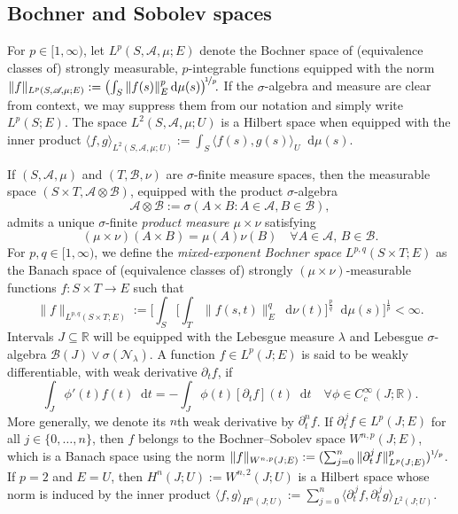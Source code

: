 \documentclass[reqno]{amsart}
\numberwithin{equation}{section}
\newcommand{\R}{\mathbb{R}}
\newcommand{\cB}{\mathcal{B}}
\newcommand{\cN}{\mathcal{N}}
\newcommand{\norm}[2]{     \| #1       \|_{ #2 }}
\newcommand{\scalar}[2]{     \langle #1       \rangle_{ #2 }}
\newcommand{\rd}{\mathop{}\!\mathrm{d}}
\newcommand{\from}{\colon}
\theoremstyle{remark}
\theoremstyle{definition}
\begin{document}
\subsection{Bochner and Sobolev spaces}
\label{subsec:app-func-spaces:Bochner-Sobolev}
For $p \in [1,\infty)$, let $L^p(S, \mathscr A\!, \mu;E)$ denote the Bochner space of 
(equivalence classes of)
strongly measurable, 
$p$-integrable functions
equipped with the norm 
% 
$
\norm{f}{L^p(S, \mathscr A \!, \mu;E)} 
:= 
\left( \int_S \norm{f(s)}{E}^p \rd \mu(s) \right)^{\!\nicefrac{1}{p}}\!\!.
$
%
If the $\sigma$-algebra and measure are clear from context,
we may suppress them from our notation and simply write $L^p(S; E)$.
The space $L^2(S, \mathscr A \!, \mu; U)$ is a Hilbert space
when equipped with the inner product 
$\scalar{f,g}{L^2(S, \mathscr A \!, \mu; U)} := \int_S \scalar{f(s),g(s)}{U} \rd \mu(s)$.

If $(S, \mathscr A\!, \mu)$ and $(T, \mathscr B, \nu)$ are $\sigma$-finite measure spaces,
then the measurable space $(S \times T, \mathscr A \otimes \mathscr B)$,
equipped with the product $\sigma$-algebra
%
\[
\mathscr A \otimes \mathscr B := \sigma(A \times B : A \in \mathscr A, B \in \mathscr B),
\]
%
admits a unique $\sigma$-finite \emph{product measure $\mu\times \nu$}
satisfying 
%
\[
(\mu \times \nu)(A \times B) = \mu(A) \nu(B) \quad \forall A \in \mathscr A, \, B \in \mathscr B.
\]
%
For $p, q \in [1,\infty)$, we define the \emph{mixed-exponent Bochner space}
$L^{p,q}(S \times T; E)$ as the Banach space of (equivalence classes of) 
strongly $(\mu \times \nu)$-measurable functions $f \from S \times T \to E$
such that
%
\begin{equation}
	\| f \|_{L^{p,q}(S \times T; E)}
	:=
	\biggl[\int_S \biggl[ \int_T \| f(s, t) \|_E^q \rd \nu(t)  \biggr]^{\frac{p}{q}} \rd \mu(s) \biggr]^{\frac{1}{p}}
	<
	\infty.
\end{equation}
%
Intervals $J \subseteq \R$ will be equipped with the Lebesgue measure $\lambda$
and Lebesgue $\sigma$-algebra $\cB(J) \vee \sigma(\cN_\lambda)$.
A function $f \in L^p(J; E)$ is said to be weakly differentiable,
with weak derivative $\partial_t f$, 
if
\[ 
\int_J \phi'(t) f(t) \rd t = -\int_J \phi(t) [\partial_t f](t) \rd t \quad \forall \phi \in C^\infty_c(J; \R).
\]
More generally, we denote its $n$th weak derivative by $\partial_t^n f$.
If $\partial_t^{\, j} f \in L^p(J; E)$
for all $j \in \{0, \dots, n\}$, then $f$ belongs to
the Bochner--Sobolev space $W^{n,p}(J; E)$, which is 
a Banach space using the norm
$\| f \|_{W^{n,p}(J; E)} := (\sum_{j=0}^{n} \| \partial_t^j f \|_{L^p(J; E)}^p)^{\nicefrac{1}{p}}$.
If $p = 2$ and $E = U$, then $H^n(J; U) := W^{n,2}(J; U)$ is a Hilbert space
whose norm is induced by the
inner product 
$\langle f,g \rangle_{H^n(J; U)} := \sum_{j=0}^n \langle \partial_t^{\, j} f, \partial_t^{\, j} g\rangle_{L^2(J;U)}$.
\end{document}
